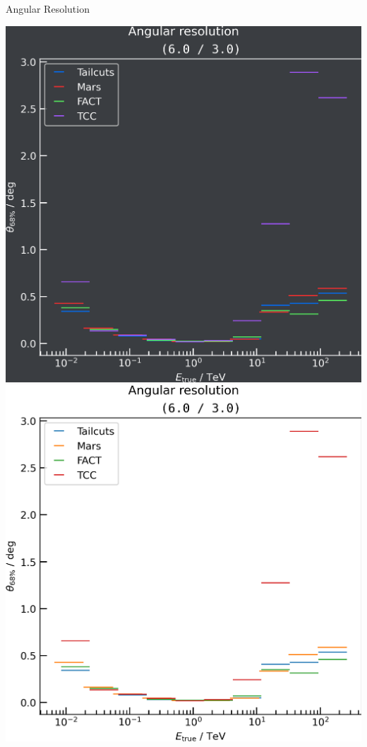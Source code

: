 \begin{frame}{Angular Resolution}
\begin{minipage}{0.32\textwidth}
    \fi
  \end{minipage}
  \begin{minipage}{0.32\textwidth}
    \ifdefined\darktheme
      \centering
      \includegraphics[width=\textwidth]{plots/ang_res/ang_res_6.0_3.0_dark.png}
    \else
      \centering
      \includegraphics[width=\textwidth]{plots/ang_res/ang_res_6.0_3.0_light.png}

\end{minipage}
\end{frame}
